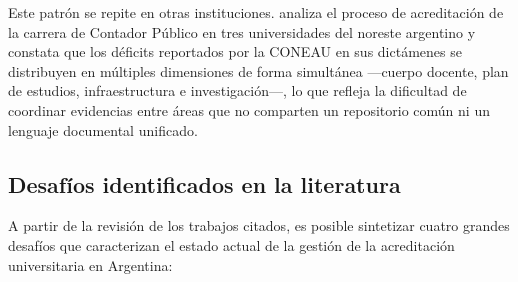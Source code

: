 Este patrón se repite en otras instituciones. \citet{sanabria2023procesos} analiza el proceso de acreditación de la carrera de Contador Público en tres universidades del noreste argentino y constata que los déficits reportados por la CONEAU en sus dictámenes se distribuyen en múltiples dimensiones de forma simultánea ---cuerpo docente, plan de estudios, infraestructura e investigación---, lo que refleja la dificultad de coordinar evidencias entre áreas que no comparten un repositorio común ni un lenguaje documental unificado.

\subsection{Desafíos identificados en la literatura}

A partir de la revisión de los trabajos citados, es posible sintetizar cuatro grandes desafíos que caracterizan el estado actual de la gestión de la acreditación universitaria en Argentina:

